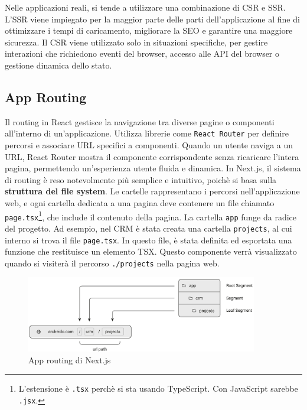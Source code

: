 \documentclass[target=bach,aauheader=,style=]{thud}
\begin{document}
\noindent Nelle applicazioni reali, si tende a utilizzare una combinazione di CSR e SSR. L'SSR viene impiegato per la maggior parte delle parti dell'applicazione al fine di ottimizzare i tempi di caricamento, migliorare la SEO e garantire una maggiore sicurezza. Il CSR viene utilizzato solo in situazioni specifiche, per gestire interazioni che richiedono eventi del browser, accesso alle API del browser o gestione dinamica dello stato.

\subsection{App Routing}
Il routing in React gestisce la navigazione tra diverse pagine o componenti all'interno di un'applicazione. Utilizza librerie come \texttt{React Router} per definire percorsi e associare URL specifici a componenti. Quando un utente naviga a un URL, React Router mostra il componente corrispondente senza ricaricare l'intera pagina, permettendo un'esperienza utente fluida e dinamica. In Next.js, il sistema di routing è reso notevolmente più semplice e intuitivo, poichè si basa sulla \textbf{struttura del file system}. Le cartelle rappresentano i percorsi nell'applicazione web, e ogni cartella dedicata a una pagina deve contenere un file chiamato \texttt{page.tsx}\footnote{L'estensione è \texttt{.tsx} perchè si sta usando TypeScript. Con JavaScript sarebbe \texttt{.jsx}.}, che include il contenuto della pagina. La cartella \texttt{app} funge da radice del progetto. Ad esempio, nel CRM è stata creata una cartella \texttt{projects}, al cui interno si trova il file \texttt{page.tsx}. In questo file, è stata definita ed esportata una funzione che restituisce un elemento TSX. Questo componente verrà visualizzato quando si visiterà il percorso \texttt{./projects} nella pagina web.

\begin{figure}[H]
    \centering
    \includegraphics[width=0.9\textwidth]{img/routing.pdf} 
    \caption{App routing \cite{nextjsdocs2024} di Next.js}
\end{figure}
\end{document}
